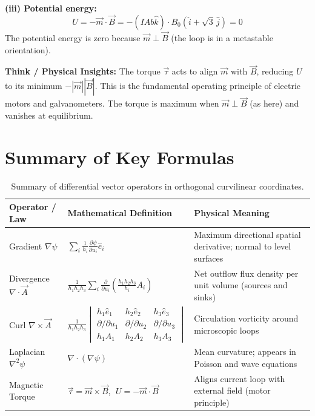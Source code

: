 \begin{psctexample}
\textbf{(iii) Potential energy:}
\begin{equation}
U = -\vec{m}\cdot\vec{B} = -(IAb\hat{k})\cdot B_0(\hat{i} + \sqrt{3}\,\hat{j}) = 0
\end{equation}
The potential energy is zero because $\vec{m} \perp \vec{B}$ (the loop is in a metastable orientation).

\textbf{\color{rbruNavy}Think / Physical Insights:}
The torque $\vec{\tau}$ acts to align $\vec{m}$ with $\vec{B}$, reducing $U$ to its minimum $-|\vec{m}||\vec{B}|$. This is the fundamental operating principle of electric motors and galvanometers. The torque is maximum when $\vec{m} \perp \vec{B}$ (as here) and vanishes at equilibrium.
\qedexam
\end{psctexample}

\section{Summary of Key Formulas}
\begin{table}[H]
\centering
\small
\begin{tabularx}{\textwidth}{llX}
\toprule
\textbf{Operator / Law} & \textbf{Mathematical Definition} & \textbf{Physical Meaning} \\
\midrule
Gradient $\nabla \psi$ & $\sum_i \frac{1}{h_i}\frac{\partial \psi}{\partial u_i}\hat{e}_i$ & Maximum directional spatial derivative; normal to level surfaces \\
Divergence $\nabla \cdot \vec{A}$ & $\frac{1}{h_1 h_2 h_3}\sum_i \frac{\partial}{\partial u_i}\left(\frac{h_1 h_2 h_3}{h_i}A_i\right)$ & Net outflow flux density per unit volume (sources and sinks) \\
Curl $\nabla \times \vec{A}$ & $\frac{1}{h_1 h_2 h_3}\begin{vmatrix} h_1\hat{e}_1 & h_2\hat{e}_2 & h_3\hat{e}_3 \\ \partial/\partial u_1 & \partial/\partial u_2 & \partial/\partial u_3 \\ h_1 A_1 & h_2 A_2 & h_3 A_3 \end{vmatrix}$ & Circulation vorticity around microscopic loops \\
Laplacian $\nabla^2 \psi$ & $\nabla \cdot (\nabla \psi)$ & Mean curvature; appears in Poisson and wave equations \\
Magnetic Torque & $\vec{\tau} = \vec{m} \times \vec{B}$, $\;U = -\vec{m}\cdot\vec{B}$ & Aligns current loop with external field (motor principle) \\
\bottomrule
\end{tabularx}
\caption{Summary of differential vector operators in orthogonal curvilinear coordinates.}
\label{tab:ch02_summary}
\end{table}

